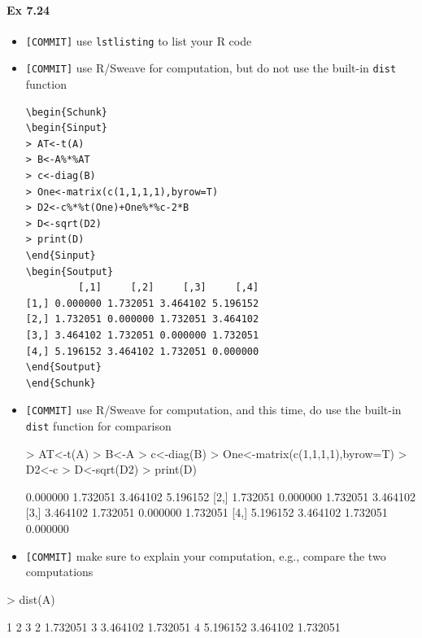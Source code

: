 \documentclass[12pt]{article}
\begin{document}
\paragraph{Ex 7.24}
\begin{itemize}
    \item \verb+[COMMIT]+ use \verb+lstlisting+ to list your R code
    \item \verb+[COMMIT]+ use R/Sweave for computation, but do not use the built-in \verb+dist+
        function
\begin{lstlisting}
\begin{Schunk}
\begin{Sinput}
> AT<-t(A)
> B<-A%*%AT
> c<-diag(B)
> One<-matrix(c(1,1,1,1),byrow=T)
> D2<-c%*%t(One)+One%*%c-2*B
> D<-sqrt(D2)
> print(D)
\end{Sinput}
\begin{Soutput}
         [,1]     [,2]     [,3]     [,4]
[1,] 0.000000 1.732051 3.464102 5.196152
[2,] 1.732051 0.000000 1.732051 3.464102
[3,] 3.464102 1.732051 0.000000 1.732051
[4,] 5.196152 3.464102 1.732051 0.000000
\end{Soutput}
\end{Schunk}
\end{lstlisting}



    \item \verb+[COMMIT]+ use R/Sweave for computation, and this time, do use the built-in \verb+dist+
        function for comparison
\begin{Schunk}
\begin{Sinput}
> AT<-t(A)
> B<-A%
> c<-diag(B)
> One<-matrix(c(1,1,1,1),byrow=T)
> D2<-c%
> D<-sqrt(D2)
> print(D)
\end{Sinput}
\begin{Soutput}
         [,1]     [,2]     [,3]     [,4]
[1,] 0.000000 1.732051 3.464102 5.196152
[2,] 1.732051 0.000000 1.732051 3.464102
[3,] 3.464102 1.732051 0.000000 1.732051
[4,] 5.196152 3.464102 1.732051 0.000000
\end{Soutput}
\end{Schunk}
    \item \verb+[COMMIT]+ make sure to explain your computation, e.g., compare the two
        computations
\end{itemize}
\begin{Schunk}
\begin{Sinput}
> dist(A)
\end{Sinput}
\begin{Soutput}
         1        2        3
2 1.732051                  
3 3.464102 1.732051         
4 5.196152 3.464102 1.732051
\end{Soutput}
\end{Schunk}
\end{document}
